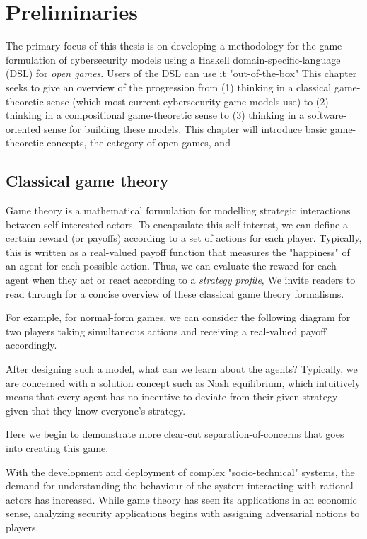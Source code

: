 \section{Preliminaries}
The primary focus of this thesis is on developing a methodology for the game formulation of cybersecurity models using a Haskell domain-specific-language (DSL) for \textit{open games}. Users of the DSL can use it "out-of-the-box" This chapter seeks to give an overview of the progression from (1) thinking in a classical game-theoretic sense (which most current cybersecurity game models use) to (2) thinking in a compositional game-theoretic sense to (3) thinking in a software-oriented sense for building these models. This chapter will introduce basic game-theoretic concepts, the category of open games, and 
\subsection{Classical game theory}

Game theory is a mathematical formulation for modelling strategic interactions between self-interested actors. To encapsulate this self-interest, we can define a certain reward (or payoffs) according to a set of actions for each player. Typically, this is written as a real-valued payoff function that measures the "happiness" of an agent for each possible action. Thus, we can evaluate the reward for each agent when they act or react according to a \textit{strategy profile}, We invite readers to read through \cite{leyton2008essentials} for a concise overview of these classical game theory formalisms.

For example, for normal-form games, we can consider the following diagram for two players taking simultaneous actions and receiving a real-valued payoff accordingly. 

After designing such a model, what can we learn about the agents? Typically, we are concerned with a solution concept such as Nash equilibrium, which intuitively means that every agent has no incentive to deviate from their given strategy given that they know everyone's strategy.


Here we begin to demonstrate more clear-cut separation-of-concerns that goes into creating this game. 

With the development and deployment of complex "socio-technical" systems, the demand for understanding the behaviour of the system interacting with rational actors has increased. While game theory has seen its applications in an economic sense, analyzing security applications begins with assigning adversarial notions to players. 

